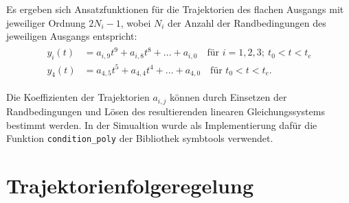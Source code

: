 Es ergeben sich Ansatzfunktionen für die Trajektorien des flachen Ausgangs mit jeweiliger Ordnung $2 N_i - 1$, wobei $N_i$ der Anzahl der Randbedingungen des jeweiligen Ausgangs entspricht:
\begin{align}
	\label{eq:polynomes_ref_trajectories}
	\begin{split}
	y_i(t) &= a_{i, 9} t^9 + a_{i, 8} t^8 + ... + a_{i, 0} \quad \text{für }  i = 1,2,3; \ t_0 < t < t_e \\
	y_4(t) &= a_{4, 5} t^5 + a_{4, 4} t^4 + ... + a_{4, 0} \quad \text{für } t_0 < t < t_e.
	\end{split}
\end{align}

Die Koeffizienten der Trajektorien $a_{i, j}$ können durch Einsetzen der Randbedingungen und Lösen des resultierenden linearen Gleichungssystems bestimmt werden. In der Simualtion wurde als Implementierung dafür die Funktion \texttt{condition\_poly} der Bibliothek symbtools verwendet.


\section{Trajektorienfolgeregelung}

